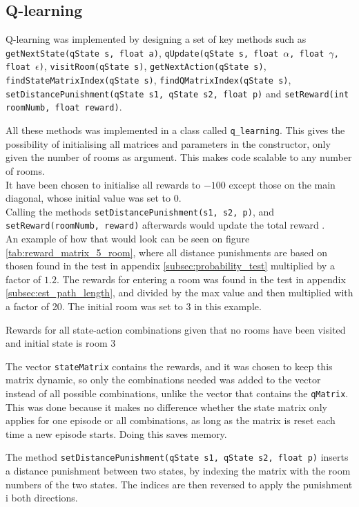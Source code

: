 \documentclass[../Head/Main.tex]{subfiles}
\begin{document}
\subsection{Q-learning}
Q-learning was implemented by designing a set of key methods such as \texttt{getNextState(qState s, float a)}, \texttt{qUpdate(qState s, float $\alpha$, float $\gamma$, float $\epsilon$)}, \texttt{visitRoom(qState s)}, \texttt{getNextAction(qState s)}, \texttt{findStateMatrixIndex(qState s)}, \texttt{findQMatrixIndex(qState s)}, \texttt{setDistancePunishment(qState s1, qState s2, float p)} and \texttt{setReward(int roomNumb, float reward)}.\par 

All these methods was implemented in a class called \texttt{q\_learning}. This gives the possibility of initialising all matrices and parameters in the constructor, only given the number of rooms as argument. This makes code scalable to any number of rooms.\\
It have been chosen to initialise all rewards to $-100$ except those on the main diagonal, whose initial value was set to $0$.\\
Calling the methods \texttt{setDistancePunishment(s1, s2, p)}, and \texttt{setReward(roomNumb, reward)} afterwards would update the total reward .\\
An example of how that would look can be seen on figure \ref{tab:reward_matrix_5_room}, where all distance punishments are based on thosen found in the test in appendix \ref{subsec:probability_test} multiplied by a factor of $1.2$. The rewards for entering a room was found in the test in appendix \ref{subsec:est_path_length}, and divided by the max value and then multiplied with a factor of 20. The initial room was set to 3 in this example.
\begin{table}[H]
	\centering
	
	\caption{Rewards for all state-action combinations given that no rooms have been visited and initial state is room 3}
	\label{tab:reward_matrix_5_room}
\end{table}
The vector \texttt{stateMatrix} contains the rewards, and it was chosen to keep this matrix dynamic, so only the combinations needed was added to the vector instead of all possible combinations, unlike the vector that contains the \texttt{qMatrix}. This was done because it makes no difference whether the state matrix only applies for one episode or all combinations, as long as the matrix is reset each time a new episode starts. Doing this saves memory.\par  
The method \texttt{setDistancePunishment(qState s1, qState s2, float p)} inserts a distance punishment between two states, by indexing the matrix with the room numbers of the two states. The indices are then reversed to apply the punishment i both directions.\par 
\end{document}
